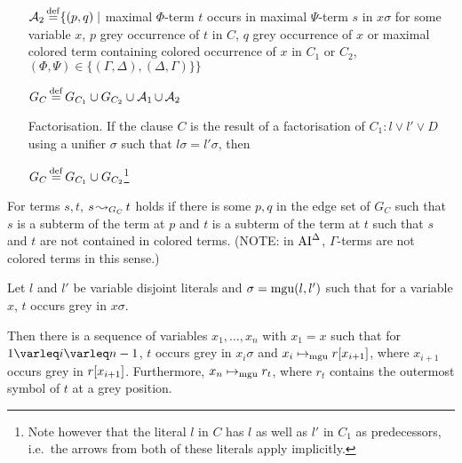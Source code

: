 \documentclass[,%
	draft=false,%
	numbers=noendperiod
	11pt,
	a4paper,
	oneside,%
	openany,
]{memoir}
\begin{document}
\begin{defi}
\begin{itemize}
			$\operatorname{\mathcal{A}}_2 \operatorname{\stackrel{\mathrm{def}}{=}} \{ (p, q) \mid $ maximal $\Phi$-term $t$ occurs in maximal $\Psi$-term $s$ in $x\sigma$ for some variable $x$, $p$ grey occurrence of $t$ in $C$, $q$ grey occurrence of $x$ or maximal colored term containing colored occurrence of $x$ in $C_1$ or $C_2$,
			$(\Phi, \Psi) \in \{(\Gamma, \Delta), (\Delta, \Gamma)\} \} $


			$G_C \operatorname{\stackrel{\mathrm{def}}{=}} G_{C_1} \cup G_{C_2} \cup \operatorname{\mathcal{A}}_1 \cup \operatorname{\mathcal{A}}_2$


		\item[Factorisation.]
			If the clause $C$ is the result of a factorisation of $C_1: l \lor l' \lor D$ using a unifier $\sigma$ such that $l\sigma = l'\sigma$, then

			$G_C \operatorname{\stackrel{\mathrm{def}}{=}} G_{C_1} \cup G_{C_2}$\footnote{Note however that the literal $l$ in $C$ has $l$ as well as $l'$ in $C_1$ as predecessors, i.e.~the arrows from both of these literals apply implicitly.}
			\qedhere
	\end{itemize}
\end{defi}

\begin{defi}
	For terms $s, t$, $s\operatorname{\leadsto}_{G_C} t$ holds if there is some $p, q$ in the edge set of $G_C$ such that $s$ is a subterm of the term at $p$ and $t$ is a subterm of the term at $t$ such that $s$ and $t$ are not contained in colored terms. (NOTE: in $\operatorname{AI}^\Delta$, $\Gamma$-terms are not colored terms in this sense.)
\end{defi}



\begin{lemma}
	\label{lemma:unified_term_starts_somewhere_grey}
	Let $l$ and $l'$ be variable disjoint literals and $\sigma = \operatorname{mgu}(l, l')$
	such that for a variable $x$, $t$ occurs grey in $x\sigma$.

	Then there is a sequence of variables $x_1,\dots, x_n$ with $x_1 = x$ such that for $1\varleq i \varleq n-1$,
	$t$ occurs grey in $x_i \sigma$ and
	$x_i \mapsto_{\operatorname{mgu}} r[x_{i+1}]$, where $x_{i+1}$ occurs grey in $r[x_{i+1}]$.
	Furthermore,
	$x_n \mapsto_{\operatorname{mgu}} r_t$, where $r_t$ contains the outermost symbol of $t$ at a grey position.
\end{lemma}
\end{document}
